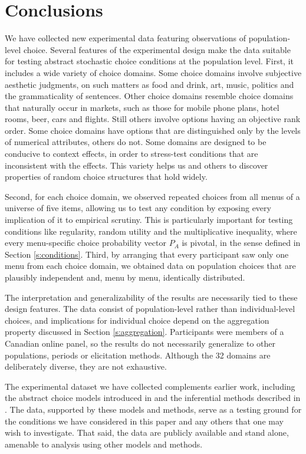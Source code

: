 \documentclass[11pt,letter]{article}
\newcommand{\menu}{menu}
\newcommand{\menus}{menus}
\begin{document}
\section{Conclusions}\label{s:conclude}

We have collected new experimental data featuring observations of population-level choice.
Several features of the experimental design make the data suitable for testing abstract stochastic choice conditions at the population level.
First, it includes a wide variety of choice domains.
Some choice domains involve subjective aesthetic judgments, on such matters as food and drink, art, music, politics and the grammaticality of sentences.
Other choice domains resemble choice domains that naturally occur in markets, such as those for mobile phone plans, hotel rooms, beer, cars and flights.
Still others involve options having an objective rank order.
Some choice domains have options that are distinguished only by the levels of numerical attributes, others do not.
Some domains are designed to be conducive to context effects, in order to stress-test conditions that are inconsistent with the effects.
This variety helps us and others to discover properties of random choice structures that hold widely.

Second, for each choice domain, we observed repeated choices from all \menus{} of a universe of five items, allowing us to test any condition by exposing every implication of it to empirical scrutiny.
This is particularly important for testing conditions like regularity, random utility and the multiplicative inequality, where every \menu{}-specific choice probability vector $P_A$ is pivotal, in the sense defined in Section \ref{s:conditions}.
Third, by arranging that every participant saw only one \menu{} from each choice domain, we obtained data on population choices that are plausibly independent and, \menu{} by \menu{}, identically distributed.

The interpretation and generalizability of the results are necessarily tied to these design features.
The data consist of population-level rather than individual-level choices, and implications for individual choice depend on the aggregation property discussed in Section \ref{s:aggregation}.
Participants were members of a Canadian online panel, so the results do not necessarily generalize to other populations, periods or elicitation methods.
Although the 32 domains are deliberately diverse, they are not exhaustive.

The experimental dataset we have collected complements earlier work, including the abstract choice models introduced in \citet{McCaMarl13} and the inferential methods described in \citet{McCaMarl14}.
The data, supported by these models and methods, serve as a testing ground for the conditions we have considered in this paper and any others that one may wish to investigate.
That said, the data are publicly available and stand alone, amenable to analysis using other models and methods.
\end{document}
